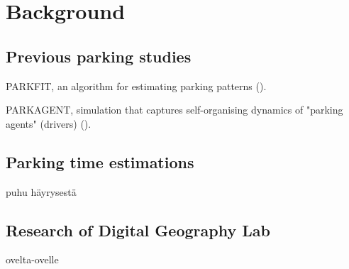 \section{Background}

\subsection{Previous parking studies}
\justify
PARKFIT, an algorithm for estimating parking patterns (\cite{Levy2015}).

PARKAGENT, simulation that captures self-organising dynamics of "parking agents" (drivers) (\cite{Benenson2008}).

\subsection{Parking time estimations}
\justify
puhu häyrysestä

\subsection{Research of Digital Geography Lab}
\justify
ovelta-ovelle